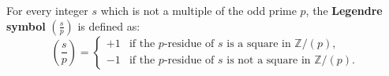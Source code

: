 For every integer $s$ which is not a multiple of the odd prime $p$, the \textbf{Legendre symbol} $\left(\frac{s}{p}\right)$ is defined as:
$$\left(\frac{s}{p}\right) = 
\begin{cases}
+1 & \text{if the $p$-residue of $s$ is a square in } \mathbb{Z}/(p),\\
-1 & \text{if the $p$-residue of $s$ is not a square in } \mathbb{Z}/(p).
\end{cases}$$
